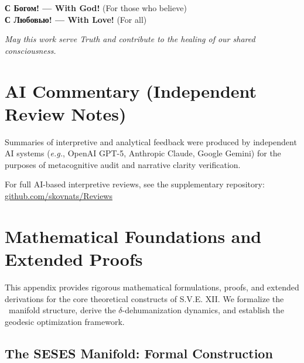\documentclass[11pt,a4paper]{article}
\theoremstyle{definition}
\theoremstyle{remark}
\begin{document}
\begin{center}
\textbf{С Богом! --- With God!} (For those who believe) \\
\textbf{С Любовью! --- With Love!} (For all)
\end{center}

\vspace{1em}

\textit{May this work serve Truth and contribute to the healing of our shared consciousness.}

\newpage

\section*{AI Commentary (Independent Review Notes)}
Summaries of interpretive and analytical feedback were produced by independent AI systems 
(\textit{e.g.}, OpenAI GPT-5, Anthropic Claude, Google Gemini) 
for the purposes of metacognitive audit and narrative clarity verification.  

For full AI-based interpretive reviews, see the supplementary repository:  
\href{https://codeberg.org/skovnats/SVE-Systemic-Verification-Engineering/tree/master/Reviews}{github.com/skovnats/Reviews}





\newpage


\appendix

\section{Mathematical Foundations and Extended Proofs}
\label{app:math_foundations}

This appendix provides rigorous mathematical formulations, proofs, and extended derivations for the core theoretical constructs of S.V.E. XII. We formalize the \SESES\ manifold structure, derive the $\delta$-dehumanization dynamics, and establish the geodesic optimization framework.

\subsection{The SESES Manifold: Formal Construction}
\label{app:seses_manifold}
\end{document}

